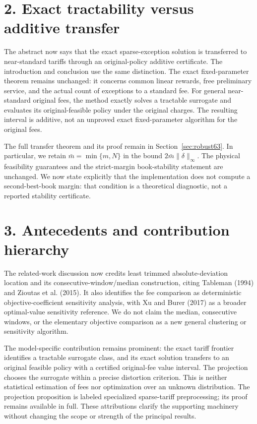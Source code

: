 \section*{2. Exact tractability versus additive transfer}
The abstract now says that the exact sparse-exception solution is transferred to near-standard tariffs through an original-policy additive certificate. The introduction and conclusion use the same distinction. The exact fixed-parameter theorem remains unchanged: it concerns common linear rewards, free preliminary service, and the actual count of exceptions to a standard fee. For general near-standard original fees, the method exactly solves a tractable surrogate and evaluates its original-feasible policy under the original charges. The resulting interval is additive, not an unproved exact fixed-parameter algorithm for the original fees.

The full transfer theorem and its proof remain in Section~\ref{sec:robust63}. In particular, we retain $\bar m=\min\{m,N\}$ in the bound $2\bar m\|\delta\|_\infty$. The physical feasibility guarantees and the strict-margin book-stability statement are unchanged. We now state explicitly that the implementation does not compute a second-best-book margin: that condition is a theoretical diagnostic, not a reported stability certificate.

\section*{3. Antecedents and contribution hierarchy}
The related-work discussion now credits least trimmed absolute-deviation location and its consecutive-window/median construction, citing Tableman (1994) and Zioutas et al. (2015). It also identifies the fee comparison as deterministic objective-coefficient sensitivity analysis, with Xu and Burer (2017) as a broader optimal-value sensitivity reference. We do not claim the median, consecutive windows, or the elementary objective comparison as a new general clustering or sensitivity algorithm.

The model-specific contribution remains prominent: the exact tariff frontier identifies a tractable surrogate class, and its exact solution transfers to an original feasible policy with a certified original-fee value interval. The projection chooses the surrogate within a precise distortion criterion. This is neither statistical estimation of fees nor optimization over an unknown distribution. The projection proposition is labeled specialized sparse-tariff preprocessing; its proof remains available in full. These attributions clarify the supporting machinery without changing the scope or strength of the principal results.

